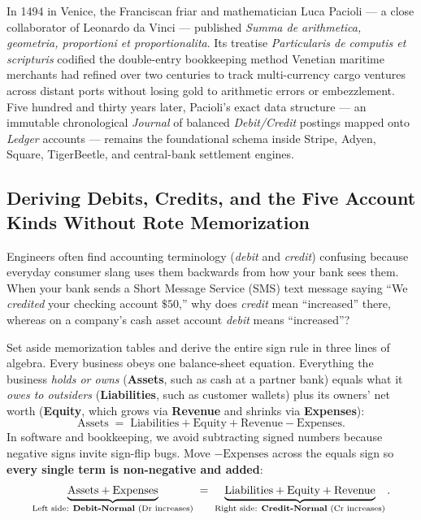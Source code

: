 \begin{historybox}
In 1494 in Venice, the Franciscan friar and mathematician Luca Pacioli --- a close collaborator of Leonardo da Vinci --- published \emph{Summa de arithmetica, geometria, proportioni et proportionalita}. Its treatise \emph{Particularis de computis et scripturis} codified the double-entry bookkeeping method Venetian maritime merchants had refined over two centuries to track multi-currency cargo ventures across distant ports without losing gold to arithmetic errors or embezzlement. Five hundred and thirty years later, Pacioli's exact data structure --- an immutable chronological \emph{Journal} of balanced \emph{Debit/Credit} postings mapped onto \emph{Ledger} accounts --- remains the foundational schema inside Stripe, Adyen, Square, TigerBeetle, and central-bank settlement engines.
\end{historybox}

\subsection{Deriving Debits, Credits, and the Five Account Kinds Without Rote Memorization}

Engineers often find accounting terminology (\emph{debit} and \emph{credit}) confusing because everyday consumer slang uses them backwards from how your bank sees them. When your bank sends a Short Message Service (SMS) text message saying ``We \emph{credited} your checking account $\$50$,'' why does \emph{credit} mean ``increased'' there, whereas on a company's cash asset account \emph{debit} means ``increased''?

Set aside memorization tables and derive the entire sign rule in three lines of algebra. Every business obeys one balance-sheet equation. Everything the business \emph{holds or owns} (\textbf{Assets}, such as cash at a partner bank) equals what it \emph{owes to outsiders} (\textbf{Liabilities}, such as customer wallets) plus its owners' net worth (\textbf{Equity}, which grows via \textbf{Revenue} and shrinks via \textbf{Expenses}):
\[
  \text{Assets} \;=\; \text{Liabilities} + \text{Equity} + \text{Revenue} - \text{Expenses}.
\]
In software and bookkeeping, we avoid subtracting signed numbers because negative signs invite sign-flip bugs. Move $-\text{Expenses}$ across the equals sign so \textbf{every single term is non-negative and added}:
\begin{equation}
  \label{ch13:eq-accounting}
  \underbrace{\text{Assets} + \text{Expenses}}_{\text{Left side: \textbf{Debit-Normal} (Dr increases)}}
  \;=\;
  \underbrace{\text{Liabilities} + \text{Equity} + \text{Revenue}}_{\text{Right side: \textbf{Credit-Normal} (Cr increases)}}.
\end{equation}

